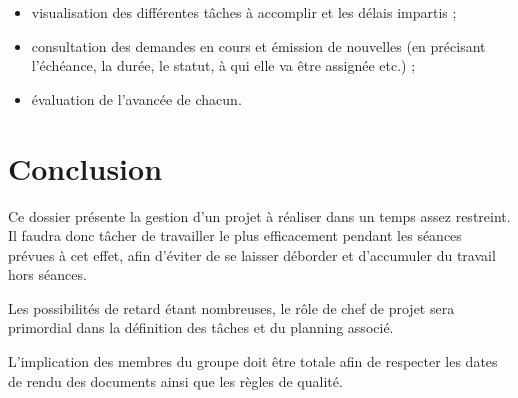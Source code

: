 \begin{itemize}
  \item visualisation des différentes tâches à accomplir et les délais impartis ;
  \item consultation des demandes en cours et émission de nouvelles (en précisant l'échéance, la durée, le statut, à qui elle va être assignée etc.) ;
  \item évaluation de l'avancée de chacun.
\end{itemize}


\section{Conclusion}
Ce dossier présente la gestion d'un projet à réaliser dans un temps assez restreint. Il faudra donc tâcher de travailler le plus efficacement pendant les séances prévues à cet effet, afin d'éviter de se laisser déborder et d'accumuler du travail hors séances.

Les possibilités de retard étant nombreuses, le rôle de chef de projet sera primordial dans la définition des tâches et du planning associé.

L'implication des membres du groupe doit être totale afin de respecter les dates de rendu des documents ainsi que les règles de qualité.

